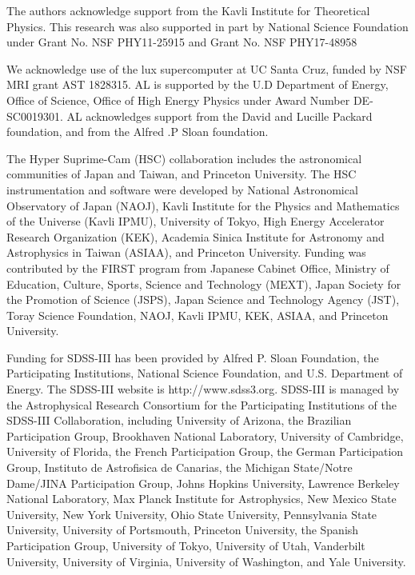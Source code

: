 \documentclass[a4paper,fleqn,usenatbib]{mnras}
\begin{document}
  The authors acknowledge support from the Kavli Institute for Theoretical Physics.
  This research was also supported in part by National Science Foundation under Grant 
  No. NSF PHY11-25915 and Grant No. NSF PHY17-48958
  
  We acknowledge use of the lux supercomputer at UC Santa Cruz, funded by NSF MRI grant AST
  1828315. AL is supported by the U.D Department of Energy, Office of Science, Office of High
  Energy Physics under Award Number DE-SC0019301. AL acknowledges support from the David and
  Lucille Packard foundation, and from the Alfred .P Sloan foundation.

  The Hyper Suprime-Cam (HSC) collaboration includes the astronomical communities of 
  Japan and Taiwan, and Princeton University.  The HSC instrumentation and software were
  developed by National Astronomical Observatory of Japan (NAOJ), Kavli Institute
  for the Physics and Mathematics of the Universe (Kavli IPMU), University of Tokyo,
  High Energy Accelerator Research Organization (KEK), Academia Sinica Institute
  for Astronomy and Astrophysics in Taiwan (ASIAA), and Princeton University.  
  Funding was contributed by the FIRST program from Japanese Cabinet Office,  Ministry 
  of Education, Culture, Sports, Science and Technology (MEXT), Japan Society for 
  the Promotion of Science (JSPS), Japan Science and Technology Agency (JST), Toray 
  Science Foundation, NAOJ, Kavli IPMU, KEK, ASIAA, and Princeton University.
   
  Funding for SDSS-III has been provided by Alfred P. Sloan Foundation, the 
  Participating Institutions, National Science Foundation, and U.S. Department of
  Energy. The SDSS-III website is http://www.sdss3.org.  SDSS-III is managed by the
  Astrophysical Research Consortium for the Participating Institutions of the SDSS-III
  Collaboration, including University of Arizona, the Brazilian Participation Group,
  Brookhaven National Laboratory, University of Cambridge, University of Florida, the
  French Participation Group, the German Participation Group, Instituto de Astrofisica
  de Canarias, the Michigan State/Notre Dame/JINA Participation Group, Johns Hopkins
  University, Lawrence Berkeley National Laboratory, Max Planck Institute for
  Astrophysics, New Mexico State University, New York University, Ohio State University,
  Pennsylvania State University, University of Portsmouth, Princeton University, the
  Spanish Participation Group, University of Tokyo, University of Utah, Vanderbilt
  University, University of Virginia, University of Washington, and Yale University.
  
\end{document}
